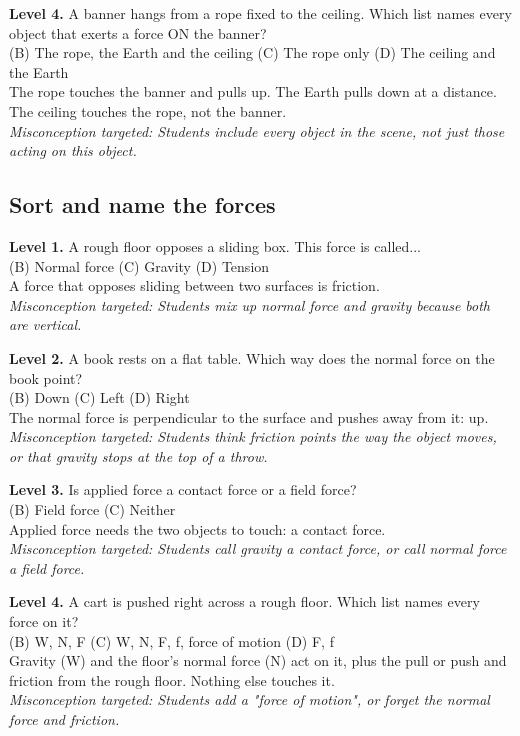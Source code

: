 \documentclass[11pt]{article}
\begin{document}
\noindent\textbf{Level 4.} A banner hangs from a rope fixed to the ceiling. Which list names every object that exerts a force ON the banner?\\  \quad (B) The rope, the Earth and the ceiling \quad (C) The rope only \quad (D) The ceiling and the Earth\\  \quad The rope touches the banner and pulls up. The Earth pulls down at a distance. The ceiling touches the rope, not the banner.\\ \textit{Misconception targeted: Students include every object in the scene, not just those acting on this object.}\par\medskip
\subsection*{Sort and name the forces}
\noindent\textbf{Level 1.} A rough floor opposes a sliding box. This force is called...\\  \quad (B) Normal force \quad (C) Gravity \quad (D) Tension\\  \quad A force that opposes sliding between two surfaces is friction.\\ \textit{Misconception targeted: Students mix up normal force and gravity because both are vertical.}\par\medskip
\noindent\textbf{Level 2.} A book rests on a flat table. Which way does the normal force on the book point?\\  \quad (B) Down \quad (C) Left \quad (D) Right\\  \quad The normal force is perpendicular to the surface and pushes away from it: up.\\ \textit{Misconception targeted: Students think friction points the way the object moves, or that gravity stops at the top of a throw.}\par\medskip
\noindent\textbf{Level 3.} Is applied force a contact force or a field force?\\  \quad (B) Field force \quad (C) Neither\\  \quad Applied force needs the two objects to touch: a contact force.\\ \textit{Misconception targeted: Students call gravity a contact force, or call normal force a field force.}\par\medskip
\noindent\textbf{Level 4.} A cart is pushed right across a rough floor. Which list names every force on it?\\  \quad (B) W, N, F \quad (C) W, N, F, f, force of motion \quad (D) F, f\\  \quad Gravity (W) and the floor's normal force (N) act on it, plus the pull or push and friction from the rough floor. Nothing else touches it.\\ \textit{Misconception targeted: Students add a "force of motion", or forget the normal force and friction.}\par\medskip
\end{document}
